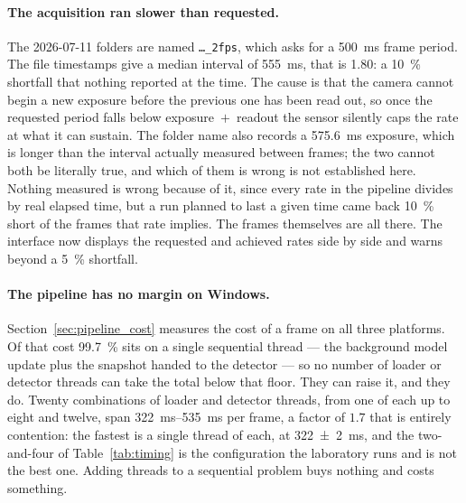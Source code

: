 \documentclass[a4paper,headsepline,oneside,11pt]{scrartcl}
\begin{document}
\paragraph{The acquisition ran slower than requested.} The 2026-07-11 folders
are named \texttt{\ldots\_2fps}, which asks for a \SI{500}{\milli\second} frame period. The file
timestamps give a median interval of \SI{555}{\milli\second}, that is \SI{1.80}{\fps}: a
\SI{10}{\percent} shortfall that nothing reported at the time. The cause is that the
camera cannot begin a new exposure before the previous one has been read out, so
once the requested period falls below exposure~$+$~readout the sensor silently
caps the rate at what it can sustain. The folder name also records a
\SI{575.6}{\milli\second} exposure, which is longer than the interval actually
measured between frames; the two cannot both be literally true, and which of them
is wrong is not established here. Nothing measured is wrong because of it, since
every rate in the pipeline divides by real elapsed time, but a run planned to
last a given time came back \SI{10}{\percent} short of the frames that rate implies. The
frames themselves are all there. The interface now displays the requested and achieved rates side by
side and warns beyond a \SI{5}{\percent} shortfall.

\paragraph{The pipeline has no margin on Windows.} Section~\ref{sec:pipeline_cost}
measures the cost of a frame on all three platforms. Of that cost
\SI{99.7}{\percent} sits on a single sequential thread --- the background
model update plus the snapshot handed to the detector --- so no number of loader
or detector threads can take the total below that floor. They can raise it, and
they do. Twenty combinations of loader and detector threads, from one of each up
to eight and twelve, span \SIrange{322}{535}{\milli\second} per frame, a factor
of $1.7$ that is entirely contention: the fastest is a single thread of each, at
\SI{322(2)}{\milli\second}, and the two-and-four of Table~\ref{tab:timing} is
the configuration the laboratory runs and is not the best one. Adding threads to
a sequential problem buys nothing and costs something.
\end{document}

